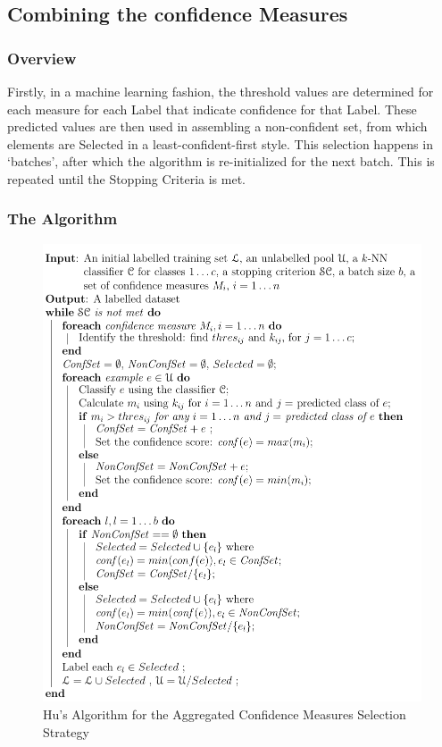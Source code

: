 \documentclass[a4paper,11pt]{report}
\begin{document}
\subsection{Combining the confidence Measures}

\subsubsection{Overview}
Firstly, in a machine learning fashion, the threshold values are determined for each measure for each Label that indicate confidence for that Label. These predicted values are then used in assembling a non-confident set, from which elements are Selected in a least-confident-first style. This selection happens in `batches', after which the algorithm is re-initialized for the next batch. This is repeated until the Stopping Criteria is met.

\begin{samepage}
\subsubsection{The Algorithm}
\begin{figure}[h!]
\includegraphics[scale=0.75]{./Others/Hu2011AggregrateAlgorithm}
\caption{Hu's Algorithm for the Aggregated Confidence Measures Selection Strategy}
\end{figure}
\end{samepage}
\end{document}
